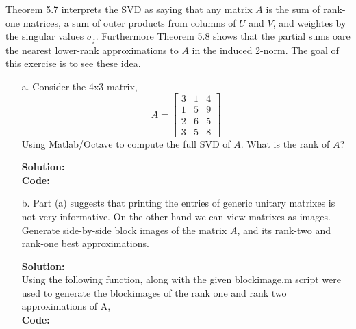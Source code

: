 \documentclass[12pt]{article}
\makeatletter
\theoremstyle{homework}
\newenvironment{exercise}[1]
{\def\@currentlabel{#1}\exercisecore}
{\endexercisecore}
\newcommand{\localhead}[1]{\par\smallskip\noindent\textbf{#1}\nobreak\\}%
\newcommand\solution{\localhead{Solution:}}
\makeatother
\begin{document}
\begin{exercise}{P11} Theorem 5.7 interprets the SVD as saying that any matrix $A$ is the sum of rank-one
  matrices, a sum of outer products from columns of $U$ and $V$, and weightes by the singular values $\sigma_j$.
  Furthermore Theorem 5.8 shows that the partial sums oare the nearest lower-rank approximations to $A$
  in the induced 2-norm. The goal of this exercise is to see these idea.\\
  \begin{enumerate}
    \item[a.] Consider the 4x3 matrix, 
    \begin{equation*}
      A = 
      \begin{bmatrix}
        3 &1& 4 \\
        1 &5& 9 \\
        2 &6& 5 \\
        3 &5& 8
      \end{bmatrix}
    \end{equation*}
    Using Matlab/Octave to compute the full SVD of $A$. What is the rank of $A$?
    \solution
    \textbf{Code:}
    \begin{center}
      
    \end{center}
    \vspace{.15in}


    \item[b.] Part (a) suggests that printing the entries of generic unitary matrixes is not very informative. 
    On the other hand we can view matrixes as images. Generate side-by-side block images of the matrix $A$, and its 
    rank-two and rank-one best approximations.\\
    \solution 
    Using the following function, along with the given blockimage.m script were used to generate the blockimages of 
    the rank one and rank two approximations of A, \\
    \textbf{Code:}
    \begin{center}
      
    \end{center}
  

\end{enumerate}
\end{exercise}
\end{document}
